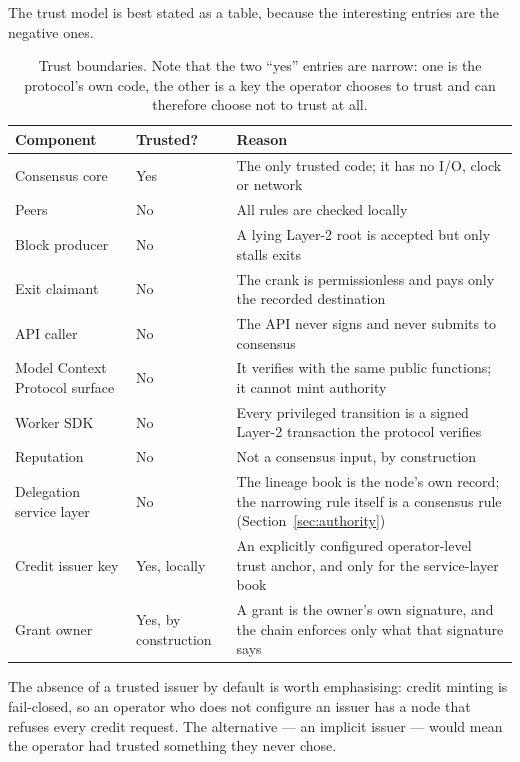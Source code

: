 \documentclass{article}
\begin{document}
The trust model is best stated as a table, because the interesting entries are
the negative ones.

\begin{table}[htbp]
\centering
\begin{tabular}{@{}p{}p{}p{}@{}}
\toprule
\textbf{Component} & \textbf{Trusted?} & \textbf{Reason} \\
\midrule
Consensus core & Yes & The only trusted code; it has no I/O, clock or network \\
Peers & No & All rules are checked locally \\
Block producer & No & A lying Layer-2 root is accepted but only stalls exits \\
Exit claimant & No & The crank is permissionless and pays only the recorded
  destination \\
API caller & No & The API never signs and never submits to consensus \\
Model Context Protocol surface & No & It verifies with the same public
  functions; it cannot mint authority \\
Worker SDK & No & Every privileged transition is a signed Layer-2 transaction
  the protocol verifies \\
Reputation & No & Not a consensus input, by construction \\
Delegation service layer & No & The lineage book is the node's own record; the
  narrowing rule itself is a consensus rule (Section~\ref{sec:authority}) \\
Credit issuer key & Yes, locally & An explicitly configured operator-level
  trust anchor, and only for the service-layer book \\
Grant owner & Yes, by construction & A grant is the owner's own signature, and
  the chain enforces only what that signature says \\
\bottomrule
\end{tabular}
\caption{Trust boundaries. Note that the two ``yes'' entries are narrow: one is
the protocol's own code, the other is a key the operator chooses to trust and
can therefore choose not to trust at all.}
\label{tab:trust}
\end{table}

The absence of a trusted issuer by default is worth emphasising: credit minting
is fail-closed, so an operator who does not configure an issuer has a node that
refuses every credit request. The alternative --- an implicit issuer --- would
mean the operator had trusted something they never chose.
\end{document}
